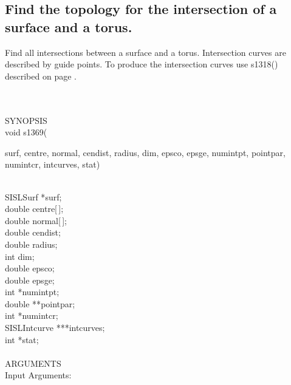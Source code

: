 \subsection{Find the topology for the intersection of a surface and a \mbox{torus}.}
\begin{minipg1}
  Find all intersections between a surface and a torus.
  Intersection curves are described by guide points.
  To produce the intersection curves use s1318() described on page \pageref{s1318}.
\end{minipg1} \\ \\
SYNOPSIS\\
        \>void s1369(\begin{minipg3}
                {\fov surf}, {\fov centre}, {\fov normal}, {\fov cendist}, {\fov radius}, {\fov dim}, {\fov epsco},
                {\fov epsge}, {\fov \linebreak}
                {\fov numintpt}, {\fov pointpar}, {\fov numintcr}, {\fov intcurves}, {\fov stat})
                \end{minipg3}\\[0.3ex]
                \>\>    SISLSurf        \>      *{\fov surf};\\
                \>\>    double  \>      {\fov centre}[\,];\\
                \>\>    double  \>      {\fov normal}[\,];\\
                \>\>    double  \>      {\fov cendist};\\
                \>\>    double  \>      {\fov radius};\\
                \>\>    int     \>      {\fov dim};\\
                \>\>    double  \>      {\fov epsco};\\
                \>\>    double  \>      {\fov epsge};\\
                \>\>    int     \>      *{\fov numintpt};\\
                \>\>    double  \>      **{\fov pointpar};\\
                \>\>    int     \>      *{\fov numintcr};\\
                \>\>    SISLIntcurve\>  ***{\fov intcurves};\\
                \>\>    int     \>      *{\fov stat};\\
\\
ARGUMENTS\\
        \>Input Arguments:\\
